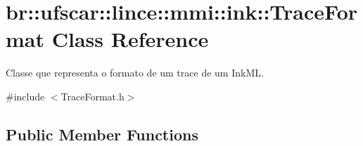 \hypertarget{classbr_1_1ufscar_1_1lince_1_1mmi_1_1ink_1_1TraceFormat}{
\section{br::ufscar::lince::mmi::ink::TraceFormat Class Reference}
\label{classbr_1_1ufscar_1_1lince_1_1mmi_1_1ink_1_1TraceFormat}
}


Classe que representa o formato de um trace de um InkML.  




{\ttfamily \#include $<$TraceFormat.h$>$}

\subsection*{Public Member Functions}
